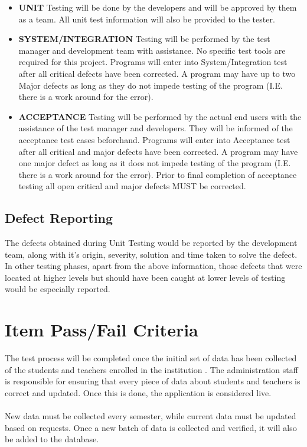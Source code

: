 \documentclass{scrreprt}
\begin{document}
\begin{itemize}
    \item \textbf{UNIT} Testing will be done by the developers and will be approved by them as a team. All unit test information will also be provided to the tester.
    \item \textbf{SYSTEM/INTEGRATION} Testing will be performed by the test manager and development team with assistance. No specific test tools are required for this project. Programs will enter into System/Integration test after all critical defects have been corrected. A program may have up to two Major defects as long as they do not impede testing of the program (I.E. there is a work around for the error).
    \item \textbf{ACCEPTANCE} Testing will be performed by the actual end users with the assistance of the test manager and developers. They will be informed of the acceptance test cases beforehand. Programs will enter into Acceptance test after all critical and major defects have been corrected. A program may have one major defect as long as it does not impede testing of the program (I.E. there is a work around for the error). Prior to final completion of acceptance testing all open critical and major defects MUST be corrected.
\end{itemize}
\section{Defect Reporting}
The defects obtained during Unit Testing would be reported by the development team, along with it's origin, severity, solution and time taken to solve the defect. \\
In other testing phases, apart from the above information, those defects that were located at higher levels but should have been caught at lower levels of testing would be especially reported.

\chapter{Item Pass/Fail Criteria}
The test process will be completed once the initial set of data has been collected of the students and teachers enrolled in the institution . The administration staff is responsible for ensuring that every piece of data about students and teachers is correct and updated. Once this is done, the application is considered live. \\\\
New data must be collected every semester, while current data must be updated based on requests. Once a new batch of data is collected and verified, it will also be added to the database.
\end{document}
